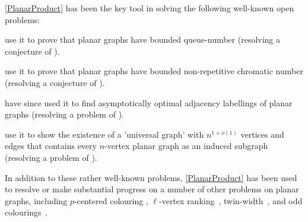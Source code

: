 \documentclass{patmorin}
\begin{document}
\noindent\cref{PlanarProduct} has been the key tool in solving the following well-known open problems:
\begin{compactitem}
\item \citet{DJMMUW20} use it to prove that planar graphs have bounded queue-number (resolving a conjecture of \citet{HLR92}).
\item  \citet{dujmovic.esperet.ea:planar} use it to prove that planar graphs have bounded non-repetitive chromatic number (resolving a conjecture of \citet{AGHR-RSA02}).
\item \citet{DEJGMM21} have since used it to find asymptotically optimal adjacency labellings of planar graphs (resolving a problem of \cite{kannan.naor.ea:implicit}).
\item \citet{EJM} use it to show the existence of a 'universal graph' with $n^{1+o(1)}$ vertices and edges that contains every $n$-vertex planar graph as an induced subgraph (resolving a problem of \citet{babai.chung.ea:on}).
\end{compactitem}
In addition to these rather well-known problems, \cref{PlanarProduct} has been used to resolve or make substantial progress on a number of other problems on planar graphs, including $p$-centered colouring \cite{DFMS21}, $\ell$-vertex ranking~\citep{BDJM}, twin-width~\citep{BKW}, and odd colourings~\citep{DMO}.

\end{document}
